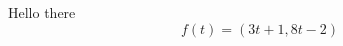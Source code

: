 \documentclass{article}
\begin{document}
    Hello there
    \[
        f(t) = (3t+1,8t-2)  
    \]
\end{document}
